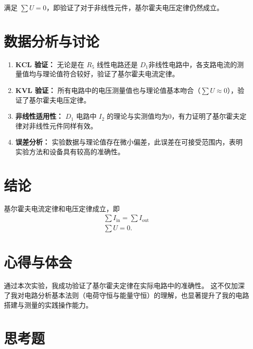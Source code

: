 \documentclass{Report} %
\begin{document}
满足 $\sum U = 0$，即验证了对于非线性元件，基尔霍夫电压定律仍然成立。

\section{数据分析与讨论}
\begin{enumerate}
    \item \textbf{KCL 验证：} 无论是在 $R_5$ 线性电路还是 $D_1$非线性电路中，各支路电流的测量值均与理论值符合较好，验证了基尔霍夫电流定律。
    \item \textbf{KVL 验证：} 所有电路中的电压测量值也与理论值基本吻合（$\sum U \approx 0$），验证了基尔霍夫电压定律。
    \item \textbf{非线性适用性：} $D_1$ 电路中 $I_2$ 的理论与实测值均为0，有力证明了基尔霍夫定律对非线性元件同样有效。
    \item \textbf{误差分析：} 实验数据与理论值存在微小偏差，此误差在可接受范围内，表明实验方法和设备具有较高的准确性。
\end{enumerate}

\section{结论}
基尔霍夫电流定律和电压定律成立，即
\begin{align}
    \sum I_\text{in} = \sum I_\text{out}\\
    \sum U = 0.
\end{align}

\section{心得与体会}

通过本次实验，我成功验证了基尔霍夫定律在实际电路中的准确性。
这不仅加深了我对电路分析基本法则（电荷守恒与能量守恒）的理解，也显著提升了我的电路搭建与测量的实践操作能力。

\section{思考题}
\end{document}
